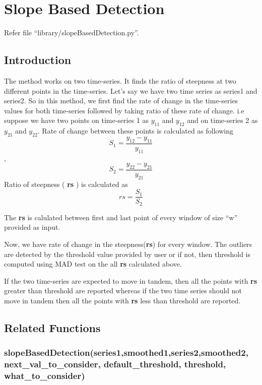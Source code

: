 \chapter{Slope Based Detection}

Refer file ``library/slopeBasedDetection.py''.

\section{Introduction}

The method works on two time-series. It finds the ratio of steepness 
at two different points in the time-series. Let's say we have two 
time series as series1 and series2. So in this method, we first find 
the rate of change in the time-series values for both time-series followed 
by taking ratio of these rate of change. i.e  suppose we have two points on 
time-series 1 as $y_{11}$ and $y_{12}$ and on time-series 2 as $y_{21}$ and $y_{22}$. 
Rate of change between these points is calculated as following
 $$S_1=\frac{y_{12}-y_{11}}{y_{11}}$$
 ,
  $$S_2=\frac{y_{22}-y_{21}}{y_{21}}$$
 Ratio of steepness ( \textbf{rs} ) is calculated as
 $$rs = \frac{S_1}{S_2}$$

The \textbf{rs} is calulated between first and last point of every window of
size ``w'' provided as input. 

Now, we have rate of change in the steepness(\textbf{rs}) for every window. 
The outliers are detected by the threshold value provided by user or if not, 
then threshold is computed using MAD test on the all \textbf{rs} calculated above.

If the two time-series are expected to move in tandem, then all the points 
with \textbf{rs} greater than threshold are reported whereas if the two time 
series should not move in tandem then all the points with \textbf{rs} less than 
threshold are reported. 

\section{Related Functions}

\subsection{slopeBasedDetection(series1,smoothed1,series2,smoothed2, \\ next\_val\_to\_consider, default\_threshold, threshold, what\_to\_consider)}

